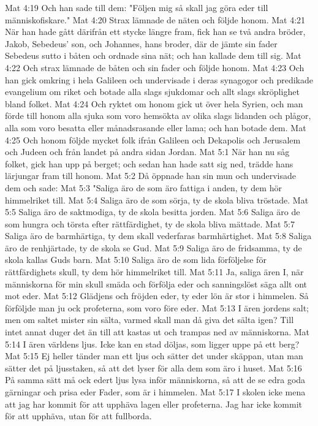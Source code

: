 Mat 4:19  Och han sade till dem: "Följen mig så skall jag göra eder till människofiskare."
Mat 4:20  Strax lämnade de näten och följde honom.
Mat 4:21  När han hade gått därifrån ett stycke längre fram, fick han se två andra bröder, Jakob, Sebedeus' son, och Johannes, hans broder, där de jämte sin fader Sebedeus sutto i båten och ordnade sina nät; och han kallade dem till sig.
Mat 4:22  Och strax lämnade de båten och sin fader och följde honom.
Mat 4:23  Och han gick omkring i hela Galileen och undervisade i deras synagogor och predikade evangelium om riket och botade alla slags sjukdomar och allt slags skröplighet bland folket.
Mat 4:24  Och ryktet om honom gick ut över hela Syrien, och man förde till honom alla sjuka som voro hemsökta av olika slags lidanden och plågor, alla som voro besatta eller månadsrasande eller lama; och han botade dem.
Mat 4:25  Och honom följde mycket folk ifrån Galileen och Dekapolis och Jerusalem och Judeen och från landet på andra sidan Jordan.
Mat 5:1  När han nu såg folket, gick han upp på berget; och sedan han hade satt sig ned, trädde hans lärjungar fram till honom.
Mat 5:2  Då öppnade han sin mun och undervisade dem och sade:
Mat 5:3  "Saliga äro de som äro fattiga i anden, ty dem hör himmelriket till.
Mat 5:4  Saliga äro de som sörja, ty de skola bliva tröstade.
Mat 5:5  Saliga äro de saktmodiga, ty de skola besitta jorden.
Mat 5:6  Saliga äro de som hungra och törsta efter rättfärdighet, ty de skola bliva mättade.
Mat 5:7  Saliga äro de barmhärtiga, ty dem skall vederfaras barmhärtighet.
Mat 5:8  Saliga äro de renhjärtade, ty de skola se Gud.
Mat 5:9  Saliga äro de fridsamma, ty de skola kallas Guds barn.
Mat 5:10  Saliga äro de som lida förföljelse för rättfärdighets skull, ty dem hör himmelriket till.
Mat 5:11  Ja, saliga ären I, när människorna för min skull smäda och förfölja eder och sanningslöst säga allt ont mot eder.
Mat 5:12  Glädjens och fröjden eder, ty eder lön är stor i himmelen. Så förföljde man ju ock profeterna, som voro före eder.
Mat 5:13  I ären jordens salt; men om saltet mister sin sälta, varmed skall man då giva det sälta igen? Till intet annat duger det än till att kastas ut och trampas ned av människorna.
Mat 5:14  I ären världens ljus. Icke kan en stad döljas, som ligger uppe på ett berg?
Mat 5:15  Ej heller tänder man ett ljus och sätter det under skäppan, utan man sätter det på ljusstaken, så att det lyser för alla dem som äro i huset.
Mat 5:16  På samma sätt må ock edert ljus lysa inför människorna, så att de se edra goda gärningar och prisa eder Fader, som är i himmelen.
Mat 5:17  I skolen icke mena att jag har kommit för att upphäva lagen eller profeterna. Jag har icke kommit för att upphäva, utan för att fullborda.
